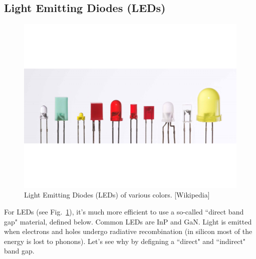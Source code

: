 \subsection{Light Emitting Diodes (LEDs)}
\begin{figure}[tb]
\centering
\includegraphics[width=.75\columnwidth]{led}
\caption{Light Emitting Diodes (LEDs) of various colors. [Wikipedia]}
\label{fig:led}
\end{figure}
For LEDs (see Fig.~\ref{fig:led}), it's much more efficient to use a so-called ``direct band gap" material, defined below.  Common LEDs are InP and GaN.  Light is emitted when electrons and holes undergo radiative recombination (in silicon most of the energy is lost to phonons).  Let's see why by defigning a ``direct" and ``indirect" band gap.
